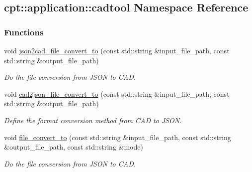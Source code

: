 \hypertarget{namespacecpt_1_1application_1_1cadtool}{\subsection{cpt\-:\-:application\-:\-:cadtool Namespace Reference}
\label{namespacecpt_1_1application_1_1cadtool}
}
\subsubsection*{Functions}
\begin{DoxyCompactItemize}
\item 
void \hyperlink{namespacecpt_1_1application_1_1cadtool_ae5bf293a816e3b11cabec9d81f83993b}{json2cad\-\_\-file\-\_\-convert\-\_\-to} (const std\-::string \&input\-\_\-file\-\_\-path, const std\-::string \&output\-\_\-file\-\_\-path)
\begin{DoxyCompactList}\small\item\em Do the file conversion from J\-S\-O\-N to C\-A\-D. \end{DoxyCompactList}\item 
void \hyperlink{namespacecpt_1_1application_1_1cadtool_a0500d549accbaf4424b87d1e3705b23f}{cad2json\-\_\-file\-\_\-convert\-\_\-to} (const std\-::string \&input\-\_\-file\-\_\-path, const std\-::string \&output\-\_\-file\-\_\-path)
\begin{DoxyCompactList}\small\item\em Define the format conversion method from C\-A\-D to J\-S\-O\-N. \end{DoxyCompactList}\item 
void \hyperlink{namespacecpt_1_1application_1_1cadtool_a6d7a86b0fd989ce884ceb29d8e5a7023}{file\-\_\-convert\-\_\-to} (const std\-::string \&input\-\_\-file\-\_\-path, const std\-::string \&output\-\_\-file\-\_\-path, const std\-::string \&mode)
\begin{DoxyCompactList}\small\item\em Do the file conversion from J\-S\-O\-N to C\-A\-D. \end{DoxyCompactList}\end{DoxyCompactItemize}


